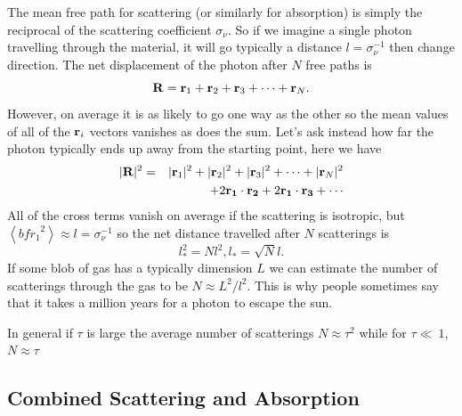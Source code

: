 The mean free path for scattering (or similarly for absorption) is
simply the reciprocal of the scattering coefficient $\sigma_\nu$.  So
if we imagine a single photon travelling through the material, it will
go typically a distance $l=\sigma_\nu^{-1}$ then change direction.  The
net displacement of the photon after $N$ free paths is
\begin{equation}
{\bf R} = {\bf r}_1 + {\bf r}_2 + {\bf r}_3 + \cdots + {\bf r}_N.
\label{eq:89}
\end{equation}
However, on average it is as likely to go one way as the other so the
mean values of all of the ${\bf r}_i$ vectors vanishes as does the
sum.   Let's ask instead how far the photon typically ends up away
from the starting point, here we have
\begin{eqnarray}
|{\bf R}|^2 &=& |{\bf r}_1|^2 + |{\bf r}_2|^2 + |{\bf r}_3|^2 + \cdots
+ |{\bf r}_N|^2 \\
 & & ~~~  + 2 {\bf r_1}\cdot {\bf r_2} + 2 {\bf r_1}\cdot {\bf r_3} + \cdots
\label{eq:90}
\end{eqnarray}
All of the cross terms vanish on average if the scattering is
isotropic, but $\left <{bf r_1}^2 \right > \approx l = \sigma_\nu^{-1}$ so the net
distance travelled after $N$ scatterings is
\begin{equation}
l_*^2 = N l^2, l_* = \sqrt{N} l.
\label{eq:91}
\end{equation}
If some blob of gas has a typically dimension $L$ we can estimate the
number of scatterings through the gas to be $N \approx L^2/l^2$.  This
is why people sometimes say that it takes a million years for a photon
to escape the sun.

In general if $\tau$ is large the average number of scatterings $N
\approx \tau^2$ while for $\tau \ll\ 1$, $N\approx \tau$

\subsection{Combined Scattering and Absorption}
\label{sec:comb-scatt-absorpt}

